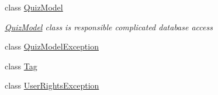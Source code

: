 \begin{DoxyCompactItemize}
\item 
class \hyperlink{class_website_1_1_models_1_1_quiz_model}{Quiz\+Model}
\begin{DoxyCompactList}\small\item\em \hyperlink{class_website_1_1_models_1_1_quiz_model}{Quiz\+Model} class is responsible complicated database access \end{DoxyCompactList}\item 
class \hyperlink{class_website_1_1_models_1_1_quiz_model_exception}{Quiz\+Model\+Exception}
\item 
class \hyperlink{class_website_1_1_models_1_1_tag}{Tag}
\item 
class \hyperlink{class_website_1_1_models_1_1_user_rights_exception}{User\+Rights\+Exception}
\end{DoxyCompactItemize}
